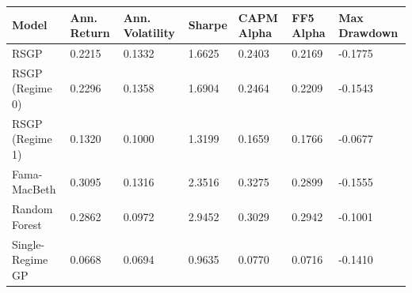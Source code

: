 \begin{tabular}{lllllll}
\hline
Model & Ann. Return & Ann. Volatility & Sharpe & CAPM Alpha & FF5 Alpha & Max Drawdown \\
\hline
RSGP & 0.2215 & 0.1332 & 1.6625 & 0.2403 & 0.2169 & -0.1775 \\
RSGP (Regime 0) & 0.2296 & 0.1358 & 1.6904 & 0.2464 & 0.2209 & -0.1543 \\
RSGP (Regime 1) & 0.1320 & 0.1000 & 1.3199 & 0.1659 & 0.1766 & -0.0677 \\
Fama-MacBeth & 0.3095 & 0.1316 & 2.3516 & 0.3275 & 0.2899 & -0.1555 \\
Random Forest & 0.2862 & 0.0972 & 2.9452 & 0.3029 & 0.2942 & -0.1001 \\
Single-Regime GP & 0.0668 & 0.0694 & 0.9635 & 0.0770 & 0.0716 & -0.1410 \\
\hline
\end{tabular}